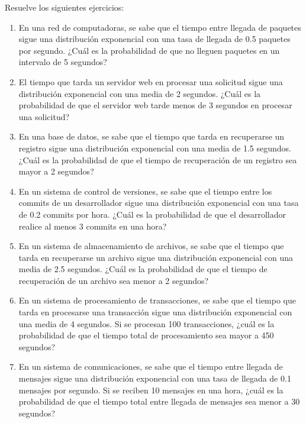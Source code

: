 \begin{Ejer}
Resuelve los siguientes ejercicios:
\begin{enumerate}


    \item En una red de computadoras, se sabe que el tiempo entre llegada de paquetes sigue una distribución exponencial con una tasa de llegada de 0.5 paquetes por segundo. ¿Cuál es la probabilidad de que no lleguen paquetes en un intervalo de 5 segundos?

    \item El tiempo que tarda un servidor web en procesar una solicitud sigue una distribución exponencial con una media de 2 segundos. ¿Cuál es la probabilidad de que el servidor web tarde menos de 3 segundos en procesar una solicitud?

    \item En una base de datos, se sabe que el tiempo que tarda en recuperarse un registro sigue una distribución exponencial con una media de 1.5 segundos. ¿Cuál es la probabilidad de que el tiempo de recuperación de un registro sea mayor a 2 segundos?

    \item En un sistema de control de versiones, se sabe que el tiempo entre los commits de un desarrollador sigue una distribución exponencial con una tasa de 0.2 commits por hora. ¿Cuál es la probabilidad de que el desarrollador realice al menos 3 commits en una hora?

    \item En un sistema de almacenamiento de archivos, se sabe que el tiempo que tarda en recuperarse un archivo sigue una distribución exponencial con una media de 2.5 segundos. ¿Cuál es la probabilidad de que el tiempo de recuperación de un archivo sea menor a 2 segundos?

    \item En un sistema de procesamiento de transacciones, se sabe que el tiempo que tarda en procesarse una transacción sigue una distribución exponencial con una media de 4 segundos. Si se procesan 100 transacciones, ¿cuál es la probabilidad de que el tiempo total de procesamiento sea mayor a 450 segundos?

    \item En un sistema de comunicaciones, se sabe que el tiempo entre llegada de mensajes sigue una distribución exponencial con una tasa de llegada de 0.1 mensajes por segundo. Si se reciben 10 mensajes en una hora, ¿cuál es la probabilidad de que el tiempo total entre llegada de mensajes sea menor a 30 segundos?


\end{enumerate}
\end{Ejer}
